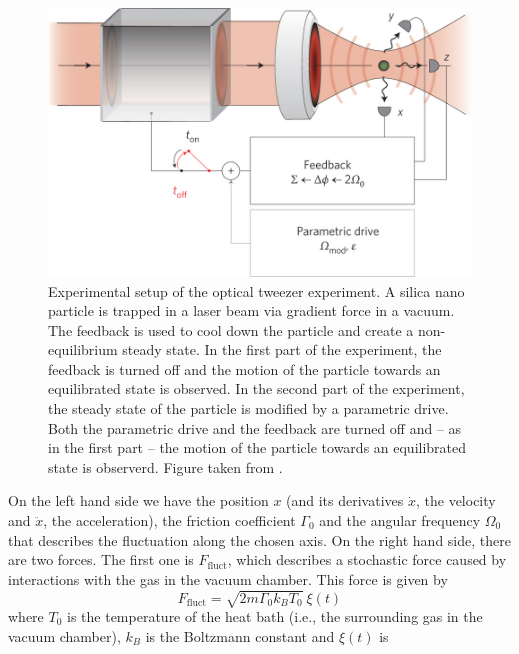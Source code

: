 \documentclass[12pt]{article}
\begin{document}
\begin{figure}[H]
    \begin{center}
        \includegraphics[scale=0.3]{images/experimental_setup.jpg}
        \caption{Experimental setup of the optical tweezer experiment. A silica nano particle is trapped in a laser beam via gradient force in a
        vacuum. The feedback is used to cool down the particle and create a non-equilibrium steady state. In the first part of the experiment, the
    feedback is turned off and the motion of the particle towards an equilibrated state is observed. In the second part of the experiment, the steady state
of the particle is modified by a parametric drive. Both the parametric drive and the feedback are turned off and -- as in the first part -- the
motion of the particle towards an equilibrated state is observerd. Figure taken from \cite{Gieseler2014}.}
        \label{fig:setup}
    \end{center}
\end{figure}
On the left hand side we have the position $x$ (and its derivatives $\dot{x}$, the velocity and $\ddot{x}$, the acceleration), the friction 
coefficient $\Gamma_0$ and the angular frequency $\Omega_0$ that describes the fluctuation along the chosen axis. On
the right hand side, there are two forces. The first one is $F_\text{fluct}$, which describes a stochastic force caused by interactions with the gas
in the vacuum chamber. This force is given by
\begin{equation}
    \label{eq:ffluct}
    F_\text{fluct} = \sqrt{2m\Gamma_0k_BT_0} \ \xi\left(t\right)
\end{equation}
where $T_0$ is the temperature of the heat bath (i.e., the surrounding gas in the vacuum chamber), $k_B$ is the Boltzmann constant and $\xi(t)$ is
\end{document}

